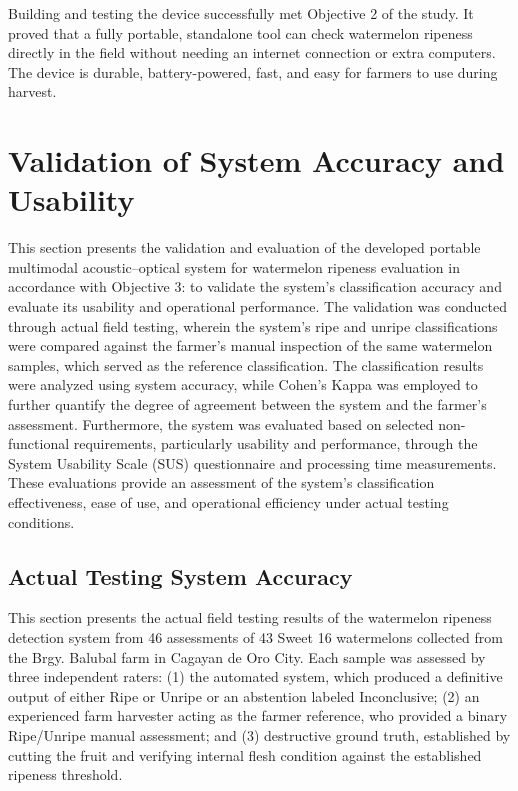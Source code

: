 \begin{thesisprose}
Building and testing the device successfully met Objective 2 of the study. It proved that a fully portable, standalone tool can check watermelon ripeness directly in the field without needing an internet connection or extra computers. The device is durable, battery-powered, fast, and easy for farmers to use during harvest.

\section{Validation of System Accuracy and Usability}

This section presents the validation and evaluation of the developed portable multimodal acoustic–optical system for watermelon ripeness evaluation in accordance with Objective 3: to validate the system's classification accuracy and evaluate its usability and operational performance. The validation was conducted through actual field testing, wherein the system's ripe and unripe classifications were compared against the farmer's manual inspection of the same watermelon samples, which served as the reference classification. The classification results were analyzed using system accuracy, while Cohen's Kappa was employed to further quantify the degree of agreement between the system and the farmer's assessment. Furthermore, the system was evaluated based on selected non-functional requirements, particularly usability and performance, through the System Usability Scale (SUS) questionnaire and processing time measurements. These evaluations provide an assessment of the system's classification effectiveness, ease of use, and operational efficiency under actual testing conditions.

\subsection{Actual Testing System Accuracy}

This section presents the actual field testing results of the watermelon ripeness detection system from 46 assessments of 43 Sweet 16 watermelons collected from the Brgy. Balubal farm in Cagayan de Oro City. Each sample was assessed by three independent raters: (1) the automated system, which produced a definitive output of either Ripe or Unripe or an abstention labeled Inconclusive; (2) an experienced farm harvester acting as the farmer reference, who provided a binary Ripe/Unripe manual assessment; and (3) destructive ground truth, established by cutting the fruit and verifying internal flesh condition against the established ripeness threshold.


\end{thesisprose}
